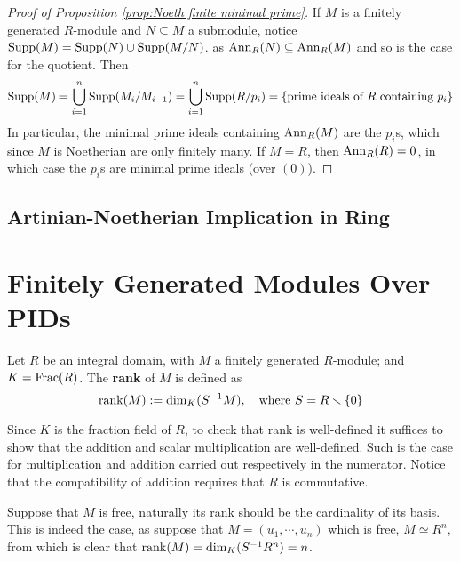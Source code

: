 \documentclass{article}
\begin{document}
\begin{proof}[Proof of Proposition \ref{prop:Noeth finite minimal prime}]
    If $M$ is a finitely generated $R$-module and $N\subseteq M$ a submodule, notice $\mathrm{Supp}(M) = \mathrm{Supp}(N) \cup \mathrm{Supp}(M/N)$. as $\mathrm{Ann}_R(N) \subseteq \mathrm{Ann}_R(M)$ and so is the case for the quotient. Then
    \[
        \mathrm{Supp}(M) = \bigcup_{i=1}^n \mathrm{Supp}(M_i/M_{i-1}) = \bigcup_{i=1}^n \mathrm{Supp}(R/p_i) = \{ \text{prime ideals of }R \text{ containing } p_i \}
    \]
    In particular, the minimal prime ideals containing $\mathrm{Ann}_R(M)$ are the $p_i$s, which since $M$ is Noetherian are only finitely many.
    If $M = R$, then $\mathrm{Ann}_R(R) = 0$, in which case the $p_i$s are minimal prime ideals (over $(0)$).
\end{proof}

\subsection{Artinian-Noetherian Implication in Ring}\label{sec:Artin-Noeth Ring Implication}

\section{Finitely Generated Modules Over PIDs}

\begin{definition}[Rank]
    Let $R$ be an integral domain, with $M$ a finitely generated $R$-module; and $K = \mathrm{Frac}(R)$. The \textbf{rank} of $M$ is defined as
    \[
        \mathrm{rank}(M) := \dim_K (S^{-1}M), \quad\text{where } S = R\smallsetminus\{0\}
    \]
\end{definition}

\begin{remark}
    Since $K$ is the fraction field of $R$, to check that rank is well-defined it suffices to show that the addition and scalar multiplication are well-defined. Such is the case for multiplication and addition carried out respectively in the numerator. Notice that the compatibility of addition requires that $R$ is commutative.
        
    Suppose that $M$ is free, naturally its rank should be the cardinality of its basis. This is indeed the case, as suppose that $M = (u_1, \cdots, u_n)$ which is free, $M \simeq R^n$, from which is clear that $\mathrm{rank}(M) = \dim_K (S^{-1} R^n) = n$.
\end{remark}
\end{document}
